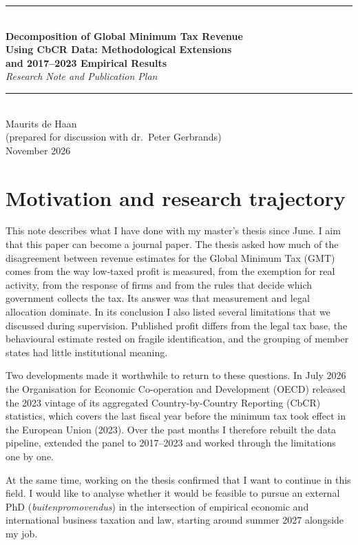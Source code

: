 \documentclass[11pt,a4paper]{article}
\newcommand{\thesisdivider}{\vspace{0.3em}\noindent\rule{\textwidth}{0.65pt}\vspace{0.35em}}
\begin{document}
\thispagestyle{plain}
\begin{center}
  \thesisdivider\\
  {\Large\bfseries Decomposition of Global Minimum Tax Revenue\\[0.1em]
  Using CbCR Data: Methodological Extensions\\[0.1em]
  and 2017–2023 Empirical Results}\\[0.5em]
  {\large\itshape Research Note and Publication Plan}\\[0.3em]
  \thesisdivider\\[0.2em]
  {\large Maurits de Haan}\\[0.15em]
  {\small (prepared for discussion with dr.\ Peter Gerbrands)}\\[0.3em]
  {\small November 2026}
\end{center}
\vspace{-0.6em}

\section{Motivation and research trajectory}

This note describes what I have done with my master's thesis since June. I aim that this paper can become a journal paper. The thesis asked how much of the disagreement between revenue estimates for the Global Minimum Tax (GMT) comes from the way low-taxed profit is measured, from the exemption for real activity, from the response of firms and from the rules that decide which government collects the tax. Its answer was that measurement and legal allocation dominate. In its conclusion I also listed several limitations that we discussed during supervision. Published profit differs from the legal tax base, the behavioural estimate rested on fragile identification, and the grouping of member states had little institutional meaning.

Two developments made it worthwhile to return to these questions. In July 2026 the Organisation for Economic Co-operation and Development (OECD) released the 2023 vintage of its aggregated Country-by-Country Reporting (CbCR) statistics, which covers the last fiscal year before the minimum tax took effect in the European Union (2023). Over the past months I therefore rebuilt the data pipeline, extended the panel to 2017–2023 and worked through the limitations one by one.

At the same time, working on the thesis confirmed that I want to continue in this field. I would like to analyse whether it would be feasible to pursue an external PhD (\emph{buitenpromovendus}) in the intersection of empirical economic and international business taxation and law, starting around summer 2027 alongside my job. 
\end{document}
